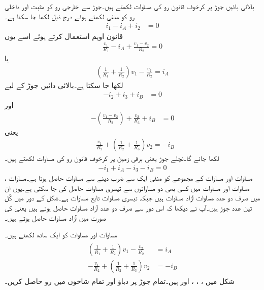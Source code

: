 بالائی بائیں جوڑ پر کرخوف قانون رو کی مساوات لکھتے ہیں۔جوڑ سے خارجی رو کو مثبت اور داخلی رو کو منفی لکھتے ہوئے درج ذیل لکھا جا سکتا ہے۔
\begin{align}\label{مساوات_جوڑ_پہلی_مثال_الف}
i_1-i_A+i_2&=0
\end{align}
قانون اوہم استعمال کرتے ہوئے اسے یوں
\begin{align*}
\frac{v_1}{R_1}-i_A+\frac{v_1-v_2}{R_2}=0
\end{align*}
یا 
\begin{align}\label{مساوات_جوڑ_پہلی_مثال_ب}
\left( \frac{1}{R_1}+\frac{1}{R_2}\right) v_1 - \frac{v_2}{R_2}=i_A
\end{align}
لکھا جا سکتا ہے۔بالائی دائیں جوڑ کے لیے
\begin{align}\label{مساوات_جوڑ_پہلی_مثال_پ}
-i_2+i_3+i_B&=0
\end{align}
اور
\begin{align*}
-\left(\frac{v_1-v_2}{R_2}\right)+\frac{v_2}{R_3}+i_B&=0
\end{align*}
یعنی
\begin{align}\label{مساوات_جوڑ_پہلی_مثال_ت}
-\frac{v_1}{R_2}+\left(\frac{1}{R_2}+\frac{1}{R_3}\right)v_2=-i_B
\end{align}
لکھا جائے گا۔نچلے جوڑ یعنی برقی زمین پر  کرخوف قانون رو کی مساوات لکھتے ہیں۔
\begin{align}\label{مساوات_جوڑ_پہلی_مثال_ٹ}
-i_1+i_A-i_3-i_B=0
\end{align}
مساوات  اور مساوات  کے مجموعے کو منفی ایک سے ضرب دینے سے مساوات  حاصل ہوتا ہے۔مساوات ، مساوات  اور  مساوات  میں کسی بھی دو مساواتوں سے تیسری مساوات حاصل کی جا سکتی ہے۔یوں ان میں صرف دو عدد مساوات آزاد مساوات ہیں جبکہ تیسری مساوات تابع مساوات ہے۔شکل  کے دور میں کُل تین عدد جوڑ ہیں۔آپ نے دیکھا کہ اس دور سے صرف دو عدد آزاد مساوات حاصل ہوتے ہیں یعنی  کی صورت میں  آزاد مساوات حاصل ہوتے ہیں۔


مساوات  اور مساوات  کو ایک ساتھ لکھتے ہیں۔
\begin{gather}
\begin{aligned}\label{مساوات_جوڑ_آزاد_مساوات_دو_جوڑ}
\left( \frac{1}{R_1}+\frac{1}{R_2}\right) v_1 - \frac{v_2}{R_2}&=i_A\\
-\frac{v_1}{R_2}+\left(\frac{1}{R_2}+\frac{1}{R_3}\right)v_2&=-i_B
\end{aligned}
\end{gather}
شکل  میں ، ، ،  اور  ہیں۔تمام جوڑ پر دباؤ اور تمام شاخوں میں رو حاصل کریں۔

